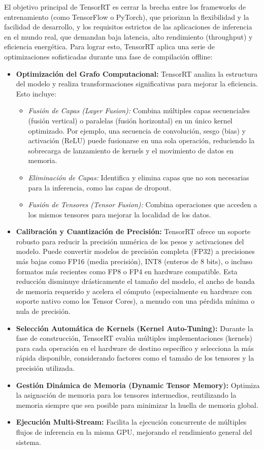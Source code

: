 \documentclass[11pt,spanish,listoffigures,listoftables]{tfgetsinf}
\begin{document}
El objetivo principal de TensorRT es cerrar la brecha entre los frameworks de entrenamiento (como TensorFlow o PyTorch), que priorizan la flexibilidad y la facilidad de desarrollo, y los requisitos estrictos de las aplicaciones de inferencia en el mundo real, que demandan baja latencia, alto rendimiento (throughput) y eficiencia energética. Para lograr esto, TensorRT aplica una serie de optimizaciones sofisticadas durante una fase de compilación offline:

\begin{itemize}
   \item \textbf{Optimización del Grafo Computacional:} TensorRT analiza la estructura del modelo y realiza transformaciones significativas para mejorar la eficiencia. Esto incluye:
      \begin{itemize}
         \item \textit{Fusión de Capas (Layer Fusion):} Combina múltiples capas secuenciales (fusión vertical) o paralelas (fusión horizontal) en un único kernel optimizado. Por ejemplo, una secuencia de convolución, sesgo (bias) y activación (ReLU) puede fusionarse en una sola operación, reduciendo la sobrecarga de lanzamiento de kernels y el movimiento de datos en memoria.
         \item \textit{Eliminación de Capas:} Identifica y elimina capas que no son necesarias para la inferencia, como las capas de dropout.
         \item \textit{Fusión de Tensores (Tensor Fusion):} Combina operaciones que acceden a los mismos tensores para mejorar la localidad de los datos.
      \end{itemize}
   \item \textbf{Calibración y Cuantización de Precisión:} TensorRT ofrece un soporte robusto para reducir la precisión numérica de los pesos y activaciones del modelo. Puede convertir modelos de precisión completa (FP32) a precisiones más bajas como FP16 (media precisión), INT8 (enteros de 8 bits), o incluso formatos más recientes como FP8 o FP4 en hardware compatible. Esta reducción disminuye drásticamente el tamaño del modelo, el ancho de banda de memoria requerido y acelera el cómputo (especialmente en hardware con soporte nativo como los Tensor Cores), a menudo con una pérdida mínima o nula de precisión.
   \item \textbf{Selección Automática de Kernels (Kernel Auto-Tuning):} Durante la fase de construcción, TensorRT evalúa múltiples implementaciones (kernels) para cada operación en el hardware de destino específico y selecciona la más rápida disponible, considerando factores como el tamaño de los tensores y la precisión utilizada.
   \item \textbf{Gestión Dinámica de Memoria (Dynamic Tensor Memory):} Optimiza la asignación de memoria para los tensores intermedios, reutilizando la memoria siempre que sea posible para minimizar la huella de memoria global.
   \item \textbf{Ejecución Multi-Stream:} Facilita la ejecución concurrente de múltiples flujos de inferencia en la misma GPU, mejorando el rendimiento general del sistema.
\end{itemize}
\end{document}
